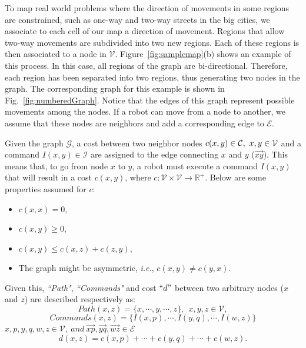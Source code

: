 \documentclass[smallcondensed]{svjour3}
\begin{document}
To map real world problems where the direction of movements in some regions are constrained, such as one-way and two-way streets in the big cities, we associate to each cell of our map a direction of movement. Regions that allow two-way movements are subdivided into two new regions. Each of these regions is then associated to a node in $\mathcal{V}$. Figure~\ref{fig:samplemap}(b) shows an example of this process. In this case, all regions of the graph are bi-directional. Therefore, each region has been separated into two regions, thus generating two nodes in the graph. The corresponding graph for this example is shown in Fig.~\ref{fig:numberedGraph}. Notice that the edges of this graph represent possible movements among the nodes. If a robot can move from a node to another, we assume that these nodes are neighbors and add a corresponding edge to $\mathcal{E}$.

Given the graph $\mathcal{G}$, a cost between two neighbor nodes $\sloppy c(x,y)\in \mathcal{C},~ x,y \in \mathcal{V}$ and a command $I(x,y) \in \mathcal{I}$ are assigned to the edge connecting $x$ and $y$ ($\overrightarrow{xy}$). This means that, to go from node $x$ to $y$, a robot must execute a command $I(x,y)$ that will result in a cost $c(x,y)$,
%
where $c:\mathcal{V} \times \mathcal{V} \rightarrow\mathbb{R}^+$. 
Below are some properties assumed for $c$:
%
\begin{itemize}
\item $c(x,x)=0$,
\item $c(x,y)\geq0$, 
\item $c(x,y)\leq c(x,z)+c(z,y)$,
\item The  graph might be asymmetric, \emph{i.e.}, $c(x,y)\neq c(y,x)$.
\end{itemize}
%

Given this, \textit{``Path"}, \textit{``Commands"} and cost $``d"$ between two arbitrary nodes ($x$ and $z$) are described respectively as:%
\[Path(x,z)=\{x,\cdots,y,\cdots,z\}, ~~x,y,z \in \mathcal V,\]
%
\[Commands(x,z)= \{I(x,p),\cdots,I(y,q),\cdots,I(w,z)\}\]
$x,p,y,q,w,z \in \mathcal V, ~and~ \overrightarrow{xp}, \overrightarrow{yq}, \overrightarrow{wz} \in \mathcal{E}$
%
\[d(x,z)=c(x,p)+\cdots+c(y,q)+\cdots+c(w,z).\]
\end{document}
